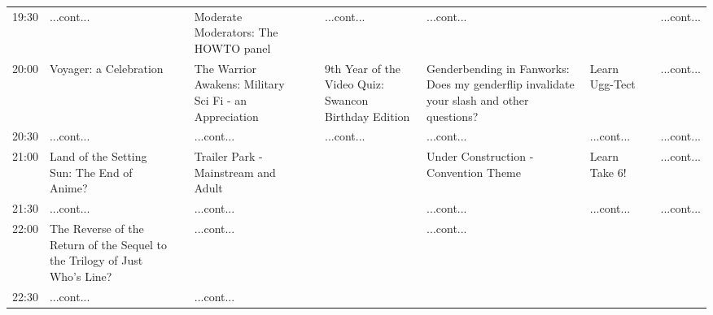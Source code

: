 \documentclass{scrreprt}
\begin{document}
\begin{landscape}
\begin{tabular}{c||p{25mm}|p{25mm}|p{25mm}|p{25mm}|p{25mm}|p{25mm}|p{25mm}|p{25mm}|p{25mm}|}
19:30&\cellcolor[gray]{0.761280} ...cont...&&\cellcolor[gray]{0.805005} Moderate Moderators: The HOWTO panel&&\cellcolor[gray]{0.601129} ...cont...&\cellcolor[gray]{0.613893} ...cont...&&&\cellcolor[gray]{0.894562} ...cont...\\
20:00&\cellcolor[gray]{0.791108} Voyager: a Celebration&&\cellcolor[gray]{0.824231} The Warrior Awakens: Military Sci Fi - an Appreciation&&\cellcolor[gray]{0.707693} 9th Year of the Video Quiz: Swancon Birthday Edition&\cellcolor[gray]{0.592770} Genderbending in Fanworks: Does my genderflip invalidate your slash and other questions?&\cellcolor[gray]{0.778258} Learn Ugg-Tect&&\cellcolor[gray]{0.894562} ...cont...\\
20:30&\cellcolor[gray]{0.791108} ...cont...&&\cellcolor[gray]{0.824231} ...cont...&&\cellcolor[gray]{0.707693} ...cont...&\cellcolor[gray]{0.592770} ...cont...&\cellcolor[gray]{0.778258} ...cont...&&\cellcolor[gray]{0.894562} ...cont...\\
21:00&\cellcolor[gray]{0.699232} Land of the Setting Sun: The End of Anime?&&\cellcolor[gray]{0.593037} Trailer Park - Mainstream and Adult&&&\cellcolor[gray]{0.617078} Under Construction - Convention Theme&\cellcolor[gray]{0.939671} Learn Take 6!&&\cellcolor[gray]{0.894562} ...cont...\\
21:30&\cellcolor[gray]{0.699232} ...cont...&&\cellcolor[gray]{0.593037} ...cont...&&&\cellcolor[gray]{0.617078} ...cont...&\cellcolor[gray]{0.939671} ...cont...&&\cellcolor[gray]{0.894562} ...cont...\\
22:00&\cellcolor[gray]{0.864084} The Reverse of the Return of the Sequel to the Trilogy of Just Who's Line?&&\cellcolor[gray]{0.593037} ...cont...&&&\cellcolor[gray]{0.617078} ...cont...&&&\\
22:30&\cellcolor[gray]{0.864084} ...cont...&&\cellcolor[gray]{0.593037} ...cont...&&&&&&\\\end{tabular}

\end{landscape}
\end{document}
